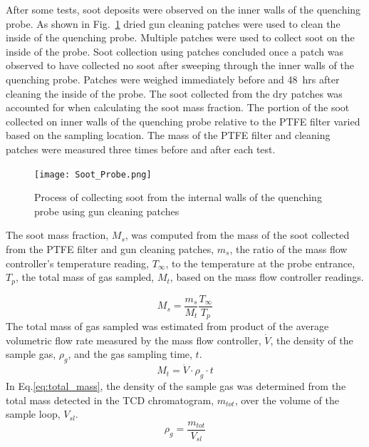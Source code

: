 \documentclass[12pt]{article}
\begin{document}
After some tests, soot deposits were observed on the inner walls of the quenching probe. As shown in Fig.~\ref{fig:Soot_Probe_Setup} dried gun cleaning patches were used to clean the inside of the quenching probe. Multiple patches were used to collect soot on the inside of the probe. Soot collection using patches concluded once a patch was observed to have collected no soot after sweeping through the inner walls of the quenching probe. Patches were weighed immediately before and 48~\si{hrs} after cleaning the inside of the probe. The soot collected from the dry patches was accounted for when calculating the soot mass fraction. The portion of the soot collected on inner walls of the quenching probe relative to the PTFE filter varied based on the sampling location. The mass of the PTFE filter and cleaning patches were measured three times before and after each test.

\begin{figure}[ht!]
	\centering
\texttt{[image: Soot\_Probe.png]}
	\caption[Process for cleaning soot probe]{Process of collecting soot from the internal walls of the quenching probe using gun cleaning patches}
	\label{fig:Soot_Probe_Setup}
\end{figure}

The soot mass fraction, $M_{s}$, was computed from the mass of the soot collected from the PTFE filter and gun cleaning patches, $m_{s}$, the ratio of the mass flow controller's temperature reading, $T_{\infty}$, to the temperature at the probe entrance,$T_{p}$, the total mass of gas sampled, $M_{t}$, based on the mass flow controller readings.

\begin{equation}\label{eq:soot_mass_frac}
  M_{s}= \frac{m_{s}}{M_{t}}\frac{T_{\infty}}{T_{p}}
\end{equation}
The total mass of gas sampled was estimated from product of the average volumetric flow rate measured by the mass flow controller, $\dot{V}$, the density of the sample gas, $\rho_{g}$, and the gas sampling time, $t$.
\begin{equation}\label{eq:total_mass}
M_{t}= \dot{V}\cdot \rho_{g}\cdot t
\end{equation}
In Eq.\ref{eq:total_mass}, the density of the sample gas was determined from the total mass detected in the TCD chromatogram, $m_{tot}$, over the volume of the sample loop, $V_{sl}$.
\begin{equation}\label{eq:gas_density}
\rho_{g}= \frac{m_{tot}}{V_{sl}}
\end{equation}
\end{document}
